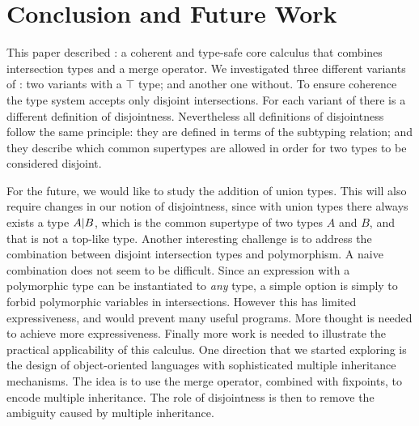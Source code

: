 \section{Conclusion and Future Work}
\label{sec:conclusion}

This paper described \name: a coherent and type-safe core calculus
that combines intersection types and a merge operator. We investigated
three different variants of \name: two variants with a $\top$ type;
and another one without. To ensure coherence the type system accepts
only disjoint intersections. For each variant of \name there is a
different definition of disjointness. Nevertheless all definitions of
disjointness follow the same principle: they are defined in terms of
the subtyping relation; and they describe which common supertypes are
allowed in order for two types to be considered disjoint.

\begin{comment}
We implemented the core functionalities of the \name as part of a JVM-based
compiler. Based on the type system of \name, we have built an ML-like
source language compiler that offers interoperability with Java (such as object
creation and method calls). The source language is loosely based on the more
general System $F_{\omega}$ and supports a
number of other features, including records, polymorphism, mutually recursive
\code{let} bindings, type aliases, algebraic data types, pattern matching, and
first-class modules that are encoded using \code{letrec} and records.
\end{comment}

For the future, we would like to study the
addition of union types. This will also require changes in our
notion of disjointness, since with union types there always exists
a type $A | B$, which is the common supertype of two
types $A$ and $B$, and that is not a top-like type.
Another interesting challenge is to address the combination between 
disjoint intersection types and polymorphism. A naive combination 
does not seem to be difficult. Since an expression with a polymorphic
type can be instantiated to \emph{any} type, a simple option is simply 
to forbid polymorphic variables in intersections. However this has 
limited expressiveness, and would prevent many useful programs. 
More thought is needed to achieve more expressiveness. 
Finally more work is needed to illustrate the practical applicability 
of this calculus. One direction that we started exploring is the
design of object-oriented languages with sophisticated multiple 
inheritance mechanisms. The idea is to use the merge operator, 
combined with fixpoints, to encode multiple inheritance. The role 
of disjointness is then to remove the ambiguity caused by multiple 
inheritance.

